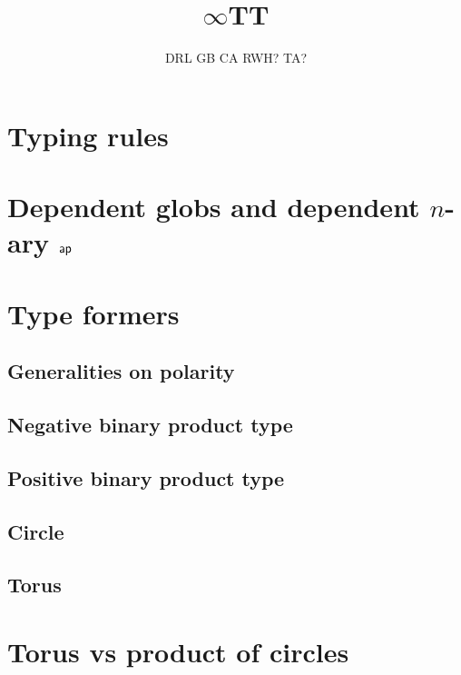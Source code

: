 \documentclass[11pt]{article}
\begin{document}
\title{$\infty$TT}
\author{DRL \qquad GB \qquad CA \qquad RWH? \qquad TA?}
\maketitle

\section{Typing rules}



\clearpage

\section{Dependent globs and dependent $n$-ary $\mathsf{ap}$}



\clearpage

\section{Type formers}

\subsection{Generalities on polarity}



\subsection{Negative binary product type}



\subsection{Positive binary product type}



\subsection{Circle}



\subsection{Torus}



\section{Torus vs product of circles}


\end{document}
